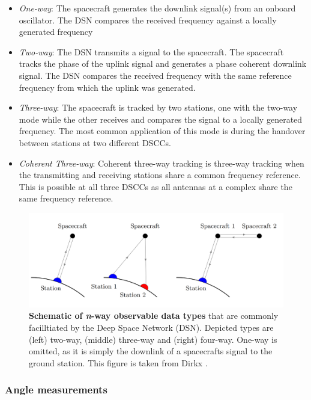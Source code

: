 \begin{itemize}
    \item \textit{One-way}: The spacecraft generates the downlink signal(s) from an
    onboard oscillator. The DSN compares the received frequency against a
    locally generated frequency
    \item \textit{Two-way}: The DSN transmits a signal to the spacecraft. The spacecraft
    tracks the phase of the uplink signal and generates a phase coherent
    downlink signal. The DSN compares the received frequency with the same
    reference frequency from which the uplink was generated.
    \item \textit{Three-way}: The spacecraft is tracked by two stations, one with the
    two-way mode while the other receives and compares the signal to a locally
    generated frequency. The most common application of this mode is during the
    handover between stations at two different DSCCs.
    \item \textit{Coherent Three-way}: Coherent three-way tracking is three-way tracking
    when the transmitting and receiving stations share a common frequency
    reference. This is possible at all three DSCCs as all antennas at a
    complex share the same frequency reference.
\end{itemize}

\begin{figure}[H]
    \centering
    \includegraphics[width=0.85\linewidth]{graphics/n-way.PNG}
    \caption{
        \textbf{Schematic of \textit{n}-way observable data types} that are
        commonly facilltiated by the Deep Space Network (DSN). Depicted types
        are (left) two-way, (middle) three-way and (right) four-way. One-way is
        omitted, as it is simply the downlink of a spacecrafts signal to the
        ground station. This figure is taken from Dirkx \cite{Dirkx2015}.
    }
    \label{fig:n-way}
\end{figure}



\subsubsection{Angle measurements}

